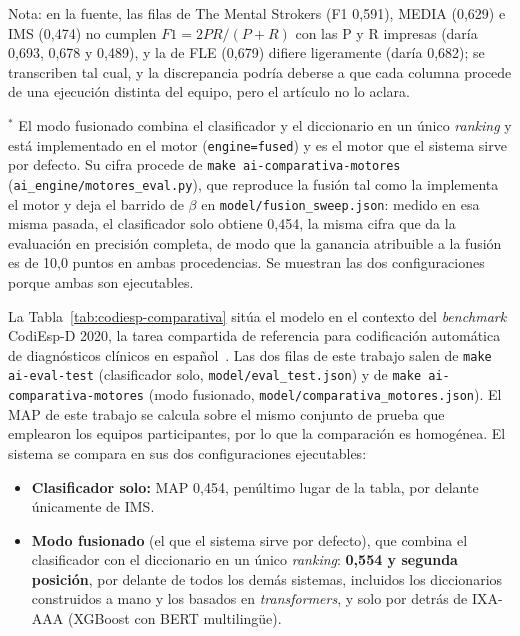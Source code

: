 \begin{table}[!tp]
{\vspace{1mm}
Nota: en la fuente, las filas de The Mental Strokers (F1 0,591), MEDIA (0,629) e IMS (0,474) no cumplen $F1=2PR/(P+R)$ con las P y R impresas (daría 0,693, 0,678 y 0,489), y la de FLE (0,679) difiere ligeramente (daría 0,682); se transcriben tal cual, y la discrepancia podría deberse a que cada columna procede de una ejecución distinta del equipo, pero el artículo no lo aclara.

\vspace{1mm}
\footnotesize $^{*}$ El modo fusionado combina el clasificador y el diccionario en un único
\emph{ranking} y está implementado en el motor (\texttt{engine=fused}) y es el motor que
el sistema sirve por defecto. Su cifra procede de
\texttt{make ai-comparativa-motores} (\texttt{ai\_engine/\allowbreak{}motores\_eval.py}), que reproduce la fusión tal como
la implementa el motor y deja el barrido de $\beta$ en \texttt{model/\allowbreak{}fusion\_sweep.json}: medido en
esa misma pasada, el clasificador solo obtiene 0,454, la misma cifra que da la evaluación en
precisión completa, de modo que la ganancia atribuible a la fusión es de 10,0 puntos en ambas
procedencias. Se muestran las dos configuraciones porque ambas son ejecutables.}
\end{table}

La Tabla~\ref{tab:codiesp-comparativa} sitúa el modelo en el contexto del \emph{benchmark} CodiEsp-D 2020, la tarea compartida de referencia para codificación automática de diagnósticos clínicos en español~\cite{miranda2020}. Las dos filas de este trabajo salen de \texttt{make ai-eval-test} (clasificador solo, \texttt{model/\allowbreak{}eval\_test.json}) y de \texttt{make ai-comparativa-motores} (modo fusionado, \texttt{model/\allowbreak{}comparativa\_motores.json}). El MAP de este trabajo se calcula sobre el mismo conjunto de prueba que emplearon los equipos participantes, por lo que la comparación es homogénea. El sistema se compara en sus dos configuraciones ejecutables:

\begin{itemize}
 \item \textbf{Clasificador solo:} MAP 0,454, penúltimo lugar de la tabla, por delante únicamente de IMS.
 \item \textbf{Modo fusionado} (el que el sistema sirve por defecto), que combina el clasificador con el diccionario en un único \emph{ranking}: \textbf{0,554 y segunda posición}, por delante de todos los demás sistemas, incluidos los diccionarios construidos a mano y los basados en \emph{transformers}, y solo por detrás de IXA-AAA (XGBoost con BERT multilingüe).
\end{itemize}

